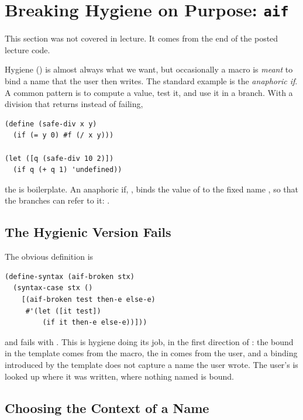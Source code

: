 \section{Breaking Hygiene on Purpose: \texttt{aif}}
\label{sec:aif}

This section was not covered in lecture. It comes from the end of the posted lecture code.

Hygiene () is almost always what we want, but occasionally a macro is \emph{meant} to bind a name that the user then writes. The standard example is the \emph{anaphoric if}. A common pattern is to compute a value, test it, and use it in a branch. With a division that returns  instead of failing,
\begin{lstlisting}
(define (safe-div x y)
  (if (= y 0) #f (/ x y)))

(let ([q (safe-div 10 2)])
  (if q (+ q 1) 'undefined))
\end{lstlisting}
the  is boilerplate. An anaphoric if, , binds the value of  to the fixed name , so that the branches can refer to it: .

\subsection{The Hygienic Version Fails}

The obvious definition is
\begin{lstlisting}
(define-syntax (aif-broken stx)
  (syntax-case stx ()
    [(aif-broken test then-e else-e)
     #'(let ([it test])
         (if it then-e else-e))]))
\end{lstlisting}
and  fails with . This is hygiene doing its job, in the first direction of : the  bound in the template comes from the macro, the  in  comes from the user, and a binding introduced by the template does not capture a name the user wrote. The user's  is looked up where it was written, where nothing named  is bound.

\subsection{Choosing the Context of a Name}

